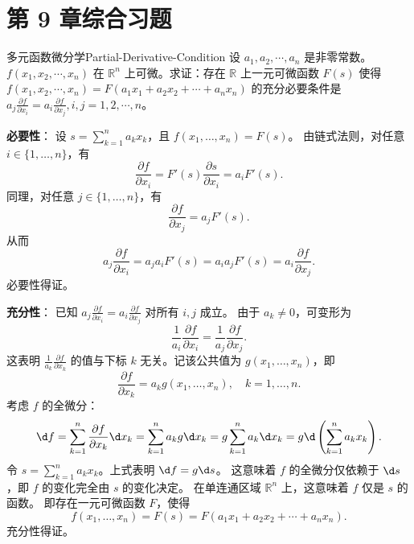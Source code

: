 \section{第 9 章综合习题}

\begin{problem}{多元函数微分学}{Partial-Derivative-Condition}
    设 $a_1, a_2, \cdots, a_n$ 是非零常数。$f(x_1, x_2, \cdots, x_n)$ 在 $\mathbb{R}^n$ 上可微。求证：存在 $\mathbb{R}$ 上一元可微函数 $F(s)$ 使得 $f(x_1, x_2, \cdots, x_n) = F(a_1 x_1 + a_2 x_2 + \cdots + a_n x_n)$ 的充分必要条件是 $a_j \frac{\partial f}{\partial x_i} = a_i \frac{\partial f}{\partial x_j}, i, j = 1, 2, \cdots, n$。
\end{problem}

\begin{solution}

    \textbf{必要性}：
    设 $s = \sum_{k=1}^n a_k x_k$，且 $f(x_1, \dots, x_n) = F(s)$。
    由链式法则，对任意 $i \in \{1, \dots, n\}$，有
    \begin{equation}
        \frac{\partial f}{\partial x_i} = F'(s) \frac{\partial s}{\partial x_i} = a_i F'(s).
    \end{equation}
    同理，对任意 $j \in \{1, \dots, n\}$，有
    \begin{equation}
        \frac{\partial f}{\partial x_j} = a_j F'(s).
    \end{equation}
    从而
    \begin{equation}
        a_j \frac{\partial f}{\partial x_i} = a_j a_i F'(s) = a_i a_j F'(s) = a_i \frac{\partial f}{\partial x_j}.
    \end{equation}
    必要性得证。

    \textbf{充分性}：
    已知 $a_j \frac{\partial f}{\partial x_i} = a_i \frac{\partial f}{\partial x_j}$ 对所有 $i, j$ 成立。
    由于 $a_k \neq 0$，可变形为
    \begin{equation}
        \frac{1}{a_i} \frac{\partial f}{\partial x_i} = \frac{1}{a_j} \frac{\partial f}{\partial x_j}.
    \end{equation}
    这表明 $\frac{1}{a_k} \frac{\partial f}{\partial x_k}$ 的值与下标 $k$ 无关。记该公共值为 $g(x_1, \dots, x_n)$，即
    \begin{equation}
        \frac{\partial f}{\partial x_k} = a_k g(x_1, \dots, x_n), \quad k=1, \dots, n.
    \end{equation}
    考虑 $f$ 的全微分：
    \begin{equation}
        \d f = \sum_{k=1}^n \frac{\partial f}{\partial x_k} \d x_k = \sum_{k=1}^n a_k g \d x_k = g \sum_{k=1}^n a_k \d x_k = g \d \left( \sum_{k=1}^n a_k x_k \right).
    \end{equation}
    令 $s = \sum_{k=1}^n a_k x_k$。上式表明 $\d f = g \d s$。
    这意味着 $f$ 的全微分仅依赖于 $\d s$，即 $f$ 的变化完全由 $s$ 的变化决定。
    在单连通区域 $\mathbb{R}^n$ 上，这意味着 $f$ 仅是 $s$ 的函数。
    即存在一元可微函数 $F$，使得
    \begin{equation}
        f(x_1, \dots, x_n) = F(s) = F(a_1 x_1 + a_2 x_2 + \cdots + a_n x_n).
    \end{equation}
    充分性得证。
\end{solution}

